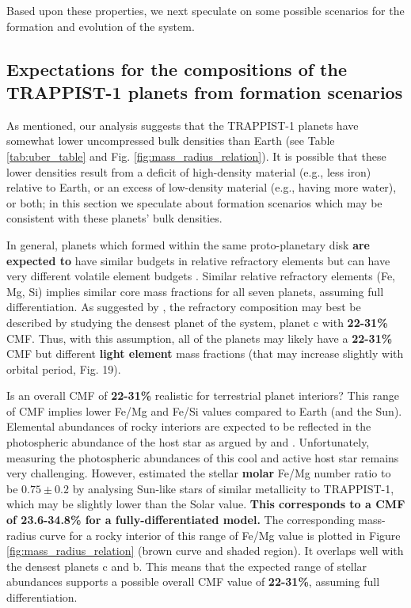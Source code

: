 \documentclass[twocolumn]{aastex63}
\begin{document}
Based upon these properties, we next speculate on some possible scenarios for the formation and evolution of the
system.

\subsection{Expectations for the compositions of the TRAPPIST-1 planets from formation scenarios} \label{sec:formation}

As mentioned, our analysis suggests that the TRAPPIST-1 planets have somewhat lower uncompressed bulk densities than Earth (see Table \ref{tab:uber_table} and Fig. \ref{fig:mass_radius_relation}).  It is possible that these lower densities result from a deficit of high-density material (e.g., less iron) relative to Earth, or an excess of low-density material (e.g., having more water), or both;  in this section we speculate about formation scenarios which may be consistent with these planets' bulk densities.

In general, planets which formed within the same proto-planetary disk \textbf{are expected to} have similar budgets in relative refractory elements \citep{bond2010making,elser2012origin} but can have
very different volatile element budgets \citep{oberg2016excess}. Similar relative refractory elements (Fe, Mg, Si) implies
similar core mass fractions for all seven planets, assuming full differentiation. As suggested by \citet{Dorn2018}, the refractory composition may best be described by studying the densest planet of the system, planet c with \textbf{22-31\%} CMF. Thus, with this assumption, all of the planets may likely have a \textbf{22-31\%} CMF but different \textbf{light element} mass fractions (that may increase slightly with orbital period, Fig. 19).

Is an overall CMF of \textbf{22-31\%} realistic for terrestrial planet interiors? This range of CMF implies lower Fe/Mg and Fe/Si values compared to Earth (and the Sun). Elemental abundances of rocky interiors are expected to be reflected in the photospheric abundance of the host star as argued by \citet{Unterborn2018a} and \citet{Dorn2018}. Unfortunately, measuring the photospheric abundances of this cool and active host star remains very challenging. However, \citet{Unterborn2018a} estimated the stellar \textbf{molar} Fe/Mg number ratio to be $0.75{\pm}0.2$ by analysing Sun-like stars of similar metallicity to TRAPPIST-1, which may be slightly lower than the Solar value. \textbf{This corresponds to a CMF of 23.6-34.8\% for a fully-differentiated model.} The corresponding mass-radius curve for a rocky interior of this range of Fe/Mg value is plotted in Figure \ref{fig:mass_radius_relation} (brown curve and shaded region). It overlaps well with the densest planets c and b. This means that the expected range of stellar abundances supports a possible overall CMF value of \textbf{22-31\%}, assuming full differentiation.
\end{document}

